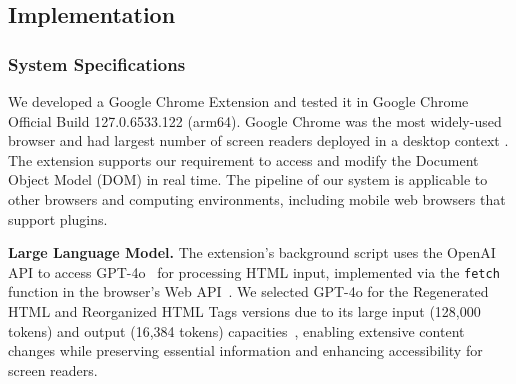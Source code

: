 

\subsection{Implementation} 

\subsubsection{System Specifications}

We developed a Google Chrome Extension and tested it in Google Chrome Official Build 127.0.6533.122 (arm64). Google Chrome was the most widely-used browser and had largest number of screen readers deployed in a desktop context \cite{webaim_screen_reader_survey_10}. The extension supports our requirement to access and modify the Document Object Model (DOM) in real time. The pipeline of our system is applicable to other browsers and computing environments, including mobile web browsers that support plugins.



\textbf{Large Language Model.} The extension's background script uses the OpenAI API to access GPT-4o~\cite{gpt4o} for processing HTML input, implemented via the \texttt{fetch} function in the browser's Web API~\cite{openai_jsonmode}. We selected GPT-4o for the Regenerated HTML and Reorganized HTML Tags versions due to its large input (128,000 tokens) and output (16,384 tokens) capacities~\cite{gpt4o-tokens}, enabling extensive content changes while preserving essential information and enhancing accessibility for screen readers.

